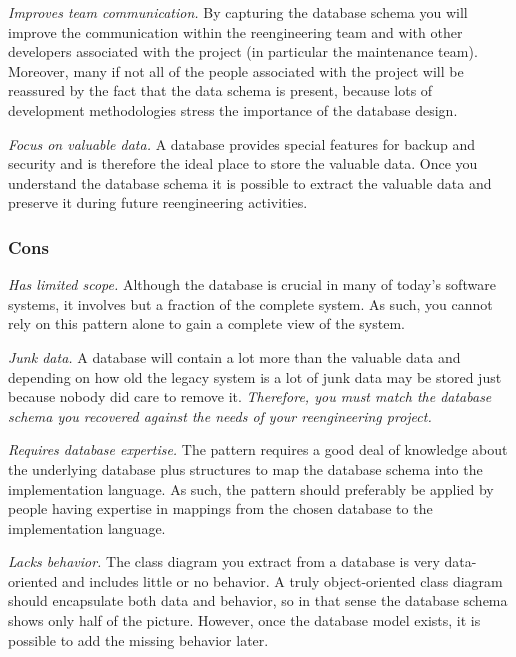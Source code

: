 \documentclass[a4paper,10pt,twoside]{book}
\begin{document}
\begin{bulletlist}
\item \emph{Improves team communication.} By capturing the database schema you will improve 
the communication within the reengineering team and with other developers associated with 
the project (in particular the maintenance team). Moreover, many if not all of the people 
associated with the project will be reassured by the fact that the data schema is present, 
because lots of development methodologies stress the importance of the database design.

\item \emph{Focus on valuable data.} A database provides special features for backup and 
security and is therefore the ideal place to store the valuable data. Once you understand 
the database schema it is possible to extract the valuable data and preserve it during 
future reengineering activities.
\end{bulletlist}

\subsubsection*{Cons}

\begin{bulletlist}
\item \emph{Has limited scope.}
Although the database is crucial in many of today's software systems, it involves but a 
fraction of the complete system. As such, you cannot rely on this pattern alone to gain a 
complete view of the system.

\item \emph{Junk data.}
A database will contain a lot more than the valuable data and depending on how old the 
legacy system is a lot of junk data may be stored just because nobody did care to remove 
it. \emph{Therefore, you must match the database schema you recovered against the needs of 
your reengineering project.}

\item \emph{Requires database expertise.}
The pattern requires a good deal of knowledge about the underlying database plus structures 
to map the database schema into the implementation language. As such, the pattern should 
preferably be applied by people having expertise in mappings from the chosen database to 
the implementation language.

\item \emph{Lacks behavior.}
The class diagram you extract from a database is very data-oriented and includes little or 
no behavior. A truly object-oriented class diagram should encapsulate both data and 
behavior, so in that sense the database schema shows only half of the picture. However, 
once the database model exists, it is possible to add the missing behavior later.
\end{bulletlist}
\end{document}
